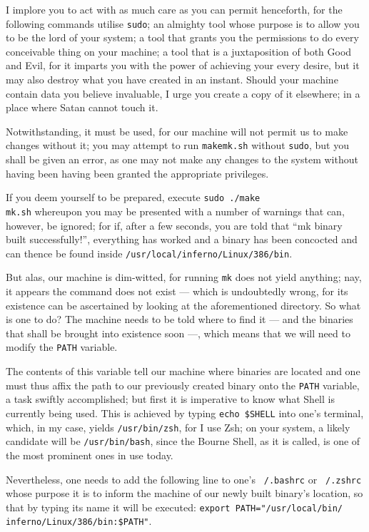 \documentclass[a5paper,twoside,12pt]{report}
\begin{document}
I implore you to act with as much care as you can permit henceforth, for the following commands utilise \texttt{sudo}; an almighty tool whose purpose is to allow you to be the lord of your system; a tool that grants you the permissions to do every conceivable thing on your machine; a tool that is a juxtaposition of both Good and Evil, for it imparts you with the power of achieving your every desire, but it may also destroy what you have created in an instant. Should your machine contain data you believe invaluable, I urge you create a copy of it elsewhere; in a place where Satan cannot touch it.

Notwithstanding, it must be used, for our machine will not permit us to make changes without it; you may attempt to run \texttt{makemk.sh} without \texttt{sudo}, but you shall be given an error, as one may not make any changes to the system without having been having been granted the appropriate privileges.

If you deem yourself to be prepared, execute \texttt{sudo ./make\\mk.sh} whereupon you may be presented with a number of warnings that can, however, be ignored; for if, after a few seconds, you are told that ``mk binary built successfully!'', everything has worked and a binary has been concocted and can thence be found inside \texttt{/usr/local/inferno/Linux/386/bin}.

But alas, our machine is dim-witted, for running \texttt{mk} does not yield anything; nay, it appears the command does not exist — which is undoubtedly wrong, for its existence can be ascertained by looking at the aforementioned directory. So what is one to do? The machine needs to be told where to find it — and the binaries that shall be brought into existence soon —, which means that we will need to modify the \texttt{PATH} variable.

The contents of this variable tell our machine where binaries are located and one must thus affix the path to our previously created binary onto the \texttt{PATH} variable, a task swiftly accomplished; but first it is imperative to know what Shell is currently being used. This is achieved by typing \texttt{echo \$SHELL} into one's terminal, which, in my case, yields \texttt{/usr/bin/zsh}, for I use Zsh; on your system, a likely candidate will be \texttt{/usr/bin/bash}, since the Bourne Shell, as it is called, is one of the most prominent ones in use today.

Nevertheless, one needs to add the following line to one's \texttt{~/.bashrc} or \texttt{~/.zshrc} whose purpose it is to inform the machine of our newly built binary's location, so that by typing its name it will be executed: \texttt{export PATH="/usr/local/bin/\\inferno/Linux/386/bin:\$PATH"}.
\end{document}
